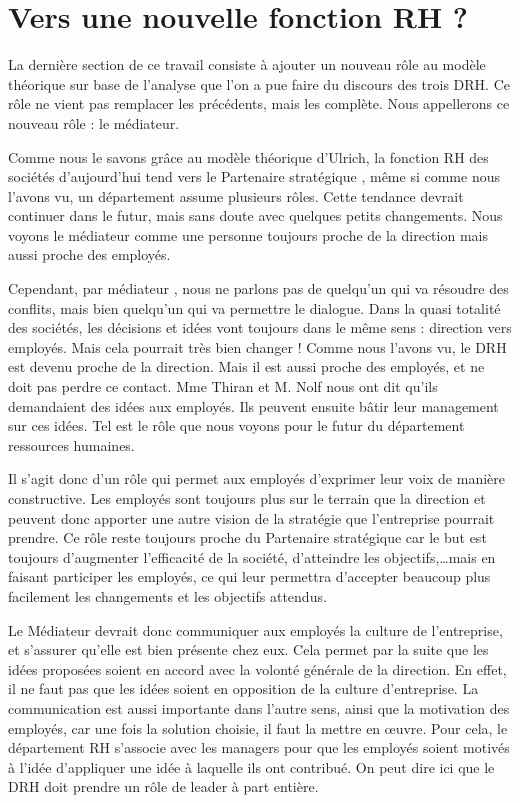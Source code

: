 \section{Vers une nouvelle fonction RH ?}

La dernière section de ce travail consiste à ajouter un nouveau rôle au modèle théorique sur base de l'analyse que l'on a pue faire du discours des trois DRH. Ce rôle ne vient pas remplacer les précédents, mais les complète.  Nous appellerons ce nouveau rôle : le \og{}médiateur\fg{}.\newline

Comme nous le savons grâce au modèle théorique d'Ulrich, la fonction RH des sociétés d'aujourd'hui tend vers le \og{}Partenaire stratégique \fg{}, même si comme nous l'avons vu, un département assume plusieurs rôles. Cette tendance devrait continuer dans le futur, mais sans doute avec quelques petits changements. Nous voyons le médiateur comme une personne toujours proche de la direction mais aussi proche des employés. \newline

Cependant, par \og{}médiateur \fg{}, nous ne parlons pas de quelqu'un qui va résoudre des conflits, mais bien quelqu'un qui va permettre le dialogue. Dans la quasi totalité des sociétés, les décisions et idées vont toujours dans le même sens : direction vers employés. Mais cela pourrait très bien changer ! Comme nous l'avons vu, le DRH est devenu proche de la direction. Mais il est aussi proche des employés, et ne doit pas perdre ce contact. Mme Thiran et M. Nolf nous ont dit qu'ils demandaient des idées aux employés. Ils peuvent ensuite bâtir leur management sur ces idées. Tel est le rôle que nous voyons pour le futur du département ressources humaines. \newline

Il s'agit donc d'un rôle qui permet aux employés d'exprimer leur voix de manière constructive. Les employés sont toujours plus sur le terrain que la direction et peuvent donc apporter une autre vision de la stratégie que l'entreprise pourrait prendre. Ce rôle reste toujours proche du \og{}Partenaire stratégique \fg{} car le but est toujours d'augmenter l'efficacité de la société, d'atteindre les objectifs,\ldots mais en faisant participer les employés, ce qui leur permettra d'accepter beaucoup plus facilement les changements et les objectifs attendus.\newline

Le \og{}Médiateur\fg{} devrait donc communiquer aux employés la culture de l'entreprise, et s'assurer qu'elle est bien présente chez eux. Cela permet par la suite que les idées proposées soient en accord avec la volonté générale de la direction. En effet, il ne faut pas que les idées soient en opposition de la culture d'entreprise. La communication est aussi importante dans l'autre sens, ainsi que la motivation des employés, car une fois la solution choisie, il faut la mettre en \oe{}uvre. Pour cela, le département RH s'associe avec les managers pour que les employés soient motivés à l'idée d'appliquer une idée à laquelle ils ont contribué. On peut dire ici que le DRH doit prendre un rôle de leader à part entière. \newline

